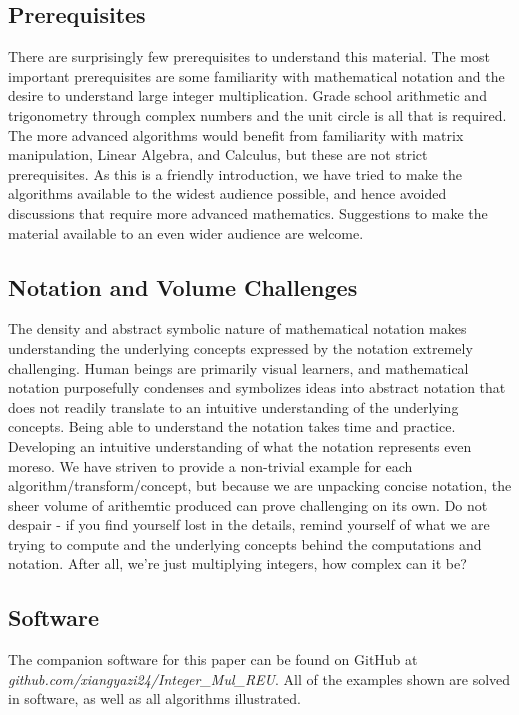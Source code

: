 \documentclass[psamsfonts,reqno]{amsart}
\theoremstyle{definition}
\theoremstyle{remark}
\numberwithin{equation}{section}
\begin{document}
\subsection{Prerequisites}
There are surprisingly few prerequisites to understand this material. The most important prerequisites are some familiarity with mathematical notation and the desire to understand large integer multiplication. Grade school arithmetic and trigonometry through complex numbers and the unit circle is all that is required. The more advanced algorithms would benefit from familiarity with matrix manipulation, Linear Algebra, and Calculus, but these are not strict prerequisites. As this is a friendly introduction, we have tried to make the algorithms available to the widest audience possible, and hence avoided discussions that require more advanced mathematics. Suggestions to make the material available to an even wider audience are welcome.

\subsection{Notation and Volume Challenges}
The density and abstract symbolic nature of mathematical notation makes understanding the underlying concepts expressed by the notation extremely challenging. Human beings are primarily visual learners, and mathematical notation purposefully condenses and symbolizes ideas into abstract notation that does not readily translate to an intuitive understanding of the underlying concepts. Being able to understand the notation takes time and practice. Developing an intuitive understanding of what the notation represents even moreso. We have striven to provide a non-trivial example for each algorithm/transform/concept, but because we are unpacking concise notation, the sheer volume of arithemtic produced can prove challenging on its own. Do not despair - if you find yourself lost in the details, remind yourself of what we are trying to compute and the underlying concepts behind the computations and notation. After all, we're just multiplying integers, how complex can it be?

\subsection{Software}
The companion software for this paper can be found on GitHub at \textit{github.com/xiangyazi24/Integer\_Mul\_REU}. All of the examples shown are solved in software, as well as all algorithms illustrated.
\end{document}
